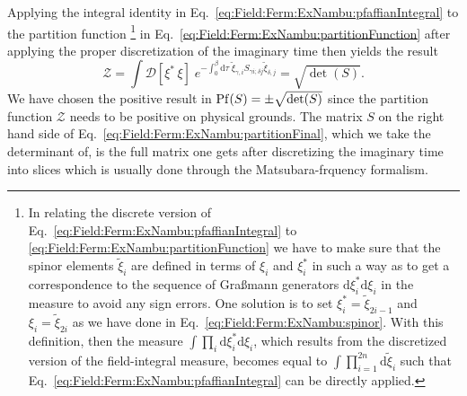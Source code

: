 Applying the integral identity in Eq.~\eqref{eq:Field:Ferm:ExNambu:pfaffianIntegral} to the partition function%
%
\footnote{In relating the discrete version of
Eq.~\eqref{eq:Field:Ferm:ExNambu:pfaffianIntegral} to \eqref{eq:Field:Ferm:ExNambu:partitionFunction} we have to make sure that the spinor elements $\tilde{\xi}_i$
are defined in terms of $\xi_i$ and $\xi_i^\ast$ in such a way as to get a correspondence to the sequence of Gra\ss mann
generators $\mathrm{d}\xi^\ast_i\mathrm{d}\xi_i$ in the measure to avoid any sign errors. One solution
is to set $\xi_i^\ast = \tilde{\xi}_{2i-1}$ and $\xi_i = \tilde{\xi}_{2i}$ as we have done in Eq.~\eqref{eq:Field:Ferm:ExNambu:spinor}. With this definition,
then the measure $\int\prod_i\mathrm{d}\xi_i^\ast\mathrm{d}\xi_i$, which results from the discretized version of the field-integral measure, becomes
equal to $\int\prod_{i=1}^{2n}\mathrm{d}\tilde{\xi}_i$ such that Eq.~\eqref{eq:Field:Ferm:ExNambu:pfaffianIntegral} can be directly applied.%
} %
%
in Eq.~\eqref{eq:Field:Ferm:ExNambu:partitionFunction}
after applying the proper discretization of the imaginary time then yields the result
\begin{equation}
    \label{eq:Field:Ferm:ExNambu:partitionFinal}
    \mathcal{Z} = \int\!\mathcal{D}[\xi^\ast\,\xi]\;e^{-\int_0^\beta\!\mathrm{d}\tau\;\tilde{\xi}_{\gamma,i}S_{\gamma i; \delta j}\tilde{\xi}_{\delta, j}} = \sqrt{\det(S)}.
\end{equation}
We have chosen the positive result in $\operatorname{Pf}(S) = \pm\sqrt{\det(S)}$ since the partition function $\mathcal{Z}$ needs to be positive on physical grounds.
The matrix $S$ on the right hand side of Eq.~\eqref{eq:Field:Ferm:ExNambu:partitionFinal}, which we take the determinant of, is the full matrix one gets after
discretizing the imaginary time into slices which is usually done through the Matsubara-frquency formalism.

